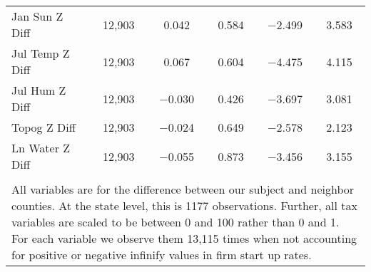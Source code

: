 \begin{table}[!htbp]
\begin{tabular}{@{\extracolsep{5pt}}lccccc}
Jan Sun Z Diff & 12,903 & 0.042 & 0.584 & $-$2.499 & 3.583 \\ 
Jul Temp Z Diff & 12,903 & 0.067 & 0.604 & $-$4.475 & 4.115 \\ 
Jul Hum Z Diff & 12,903 & $-$0.030 & 0.426 & $-$3.697 & 3.081 \\ 
Topog Z Diff & 12,903 & $-$0.024 & 0.649 & $-$2.578 & 2.123 \\ 
Ln Water Z Diff & 12,903 & $-$0.055 & 0.873 & $-$3.456 & 3.155 \\ 
\hline \\[-1.8ex] 
\multicolumn{6}{l}{All variables are for the difference between our subject and neighbor counties. At the state level, this is 1177 observations. Further, all tax variables are scaled to be between 0 and 100 rather than 0 and 1. For each variable we observe them 13,115 times when not accounting for positive or negative infinify values in firm start up rates.} \\ 
\end{tabular} 
\end{table} 

